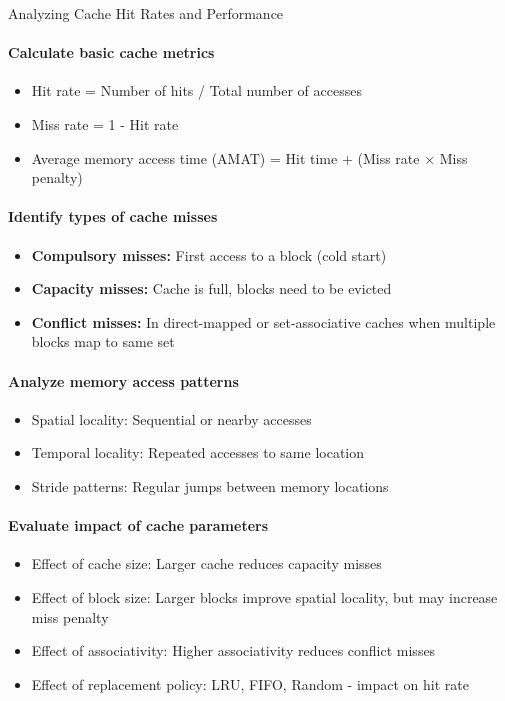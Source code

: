 \begin{KR}{Analyzing Cache Hit Rates and Performance}\\
\paragraph{Calculate basic cache metrics}
\begin{itemize}
    \item Hit rate = Number of hits / Total number of accesses
    \item Miss rate = 1 - Hit rate
    \item Average memory access time (AMAT) = Hit time + (Miss rate × Miss penalty)
\end{itemize}

\paragraph{Identify types of cache misses}
\begin{itemize}
    \item \textbf{Compulsory misses:} First access to a block (cold start)
    \item \textbf{Capacity misses:} Cache is full, blocks need to be evicted
    \item \textbf{Conflict misses:} In direct-mapped or set-associative caches when multiple blocks map to same set
\end{itemize}

\paragraph{Analyze memory access patterns}
\begin{itemize}
    \item Spatial locality: Sequential or nearby accesses
    \item Temporal locality: Repeated accesses to same location
    \item Stride patterns: Regular jumps between memory locations
\end{itemize}

\paragraph{Evaluate impact of cache parameters}
\begin{itemize}
    \item Effect of cache size: Larger cache reduces capacity misses
    \item Effect of block size: Larger blocks improve spatial locality, but may increase miss penalty
    \item Effect of associativity: Higher associativity reduces conflict misses
    \item Effect of replacement policy: LRU, FIFO, Random - impact on hit rate
\end{itemize}
\end{KR}

